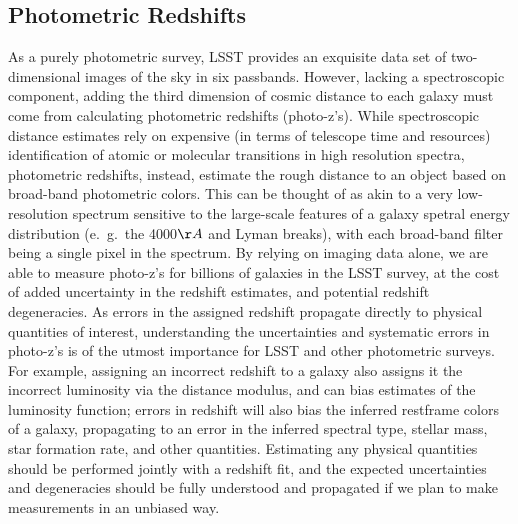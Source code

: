 \subsection{Photometric Redshifts}
\label{sec:sci:gal:bkgnd:photoz}
As a purely photometric survey, LSST provides an exquisite data set of two-dimensional images of the sky in six passbands.  However, lacking a spectroscopic component, adding the third dimension of cosmic distance to each galaxy must come from calculating photometric redshifts (photo-z's).  While spectroscopic distance estimates rely on expensive (in terms of telescope time and resources) identification of atomic or molecular transitions in high resolution spectra, photometric redshifts, instead, estimate the rough distance to an object based on broad-band photometric colors.  This can be thought of as akin to a very low-resolution spectrum sensitive to the large-scale features of a galaxy spetral energy distribution (e.~g.~the 4000$\AA$ and Lyman breaks), with each broad-band filter being a single pixel in the spectrum.  By relying on imaging data alone, we are able to measure photo-z's for billions of galaxies in the LSST survey, at the cost of added uncertainty in the redshift estimates, and potential redshift degeneracies.  
   As errors in the assigned redshift propagate directly to physical quantities of interest, understanding the uncertainties and systematic errors in photo-z's is of the utmost importance for LSST and other photometric surveys.  For example, assigning an incorrect redshift to a galaxy also assigns it the incorrect luminosity via the distance modulus, and can bias estimates of the luminosity function; errors in redshift will also bias the inferred restframe colors of a galaxy, propagating to an error in the inferred spectral type, stellar mass, star formation rate, and other quantities.  Estimating any physical quantities should be performed jointly with a redshift fit, and the expected uncertainties and degeneracies should be fully understood and propagated if we plan to make measurements in an unbiased way.  
